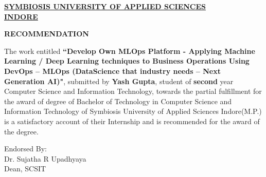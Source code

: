 \documentclass[12pt,oneside,a4paper]{report}
\begin{document}
\newpage 
\begin{large}
\begin{center}
\fontsize{18pt}{10pt}\selectfont
\underline{\textbf{SYMBIOSIS UNIVERSITY OF APPLIED SCIENCES}}\\
\vspace{5.0mm}\underline{\textbf{INDORE}}
\end{center}
\end{large}
\vspace{1.0in}
\begin{large}
\begin{center}
\fontsize{16pt}{10pt}\selectfont
\textbf{RECOMMENDATION}
\end{center}
\end{large}
\vspace{0.8in}
The work entitled \textbf{“Develop Own MLOps Platform - Applying Machine Learning / Deep Learning techniques to Business Operations Using DevOps – MLOps (DataScience that industry needs – Next Generation AI)"}, submitted by \textbf{Yash Gupta}, student of \textbf{second} year Computer Science and Information Technology, towards the partial fulfillment for the award of degree of Bachelor of Technology in Computer Science and Information Technology of Symbiosis University of Applied Sciences Indore(M.P.) is a satisfactory account of their Internship and is recommended for the award of the degree.\\
\vspace{1.2in}
\begin{flushleft}
Endorsed By:\\Dr. Sujatha R Upadhyaya\\
Dean, SCSIT
\end{flushleft}
\end{document}
